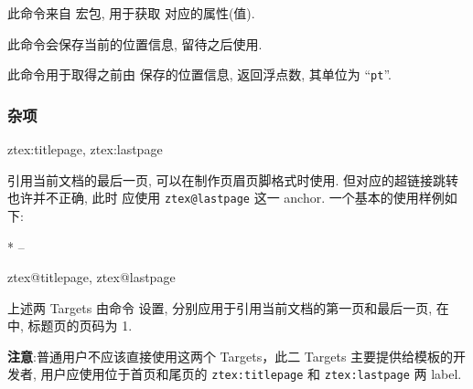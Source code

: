 \begin{function}[added=2025-09-20, EXP]{\RefProperty}
  \begin{syntax}
    \cmd{\RefProperty}
  \end{syntax}
  此命令来自  宏包, 用于获取  对应的属性(值).
\end{function}



\begin{function}[added=2025-09-20]{\zrefsavepos}
  \begin{syntax}
    \cmd{\zrefsavepos}
  \end{syntax}
  此命令会保存当前的位置信息, 留待之后使用.
\end{function}



\begin{function}[added=2025-09-20, EXP]{\zrefgetpos}
  \begin{syntax}
    \cmd{\zrefgetpos}
  \end{syntax}
  此命令用于取得之前由 \cmd{\zrefsavepos} 保存的位置信息, 返回浮点数, 其单位为 ``\texttt{pt}''.
\end{function}



\clearpage
\subsubsection{杂项}
\begin{function}[updated=2025-04-25]{ztex:titlepage, ztex:lastpage}
  \begin{syntax}
    \cmd{\pageref}
    \cmd{\pageref}
  \end{syntax}
  引用当前文档的最后一页, 可以在制作页眉页脚格式时使用. 但对应的超链接跳转也许并不正确, 此时
  应使用 \texttt{ztex@lastpage} 这一 anchor. 一个基本的使用样例如下:
\end{function}
\begin{DocExample}*
  \pageref{ztex:titlepage}--\pageref{ztex:lastpage}
\end{DocExample}


\begin{function}[updated=2025-04-25]{ztex@titlepage, ztex@lastpage}
  \begin{syntax}
  \end{syntax}
  上述两 Targets 由命令  设置, 分别应用于引用当前文档的第一页和最后一页, 在 \ztex{} 中, 标题页的页码为 1.

  \textbf{注意}:普通用户不应该直接使用这两个 Targets，此二 Targets 主要提供给模板的开发者, 用户应使用位于首页和尾页的 \texttt{ztex:titlepage} 
  和 \texttt{ztex:lastpage} 两 label.
\end{function}

